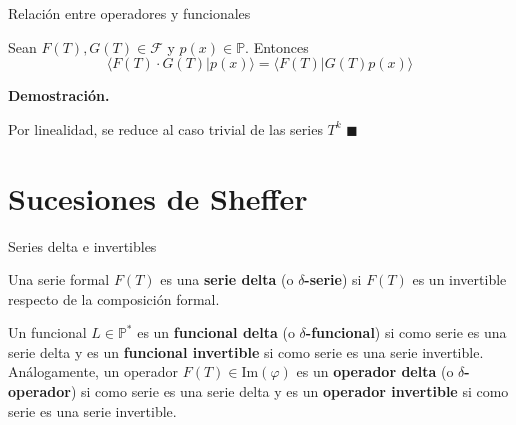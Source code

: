\documentclass{beamer}
\newenvironment{teorema}[1][]{
  \begin{tcolorbox}[colback=darkred!10, colframe=darkred!90, title=Teorema\ #1, fonttitle=\bfseries]
}{
  \end{tcolorbox}
}
\newenvironment{definicion}[1][]{
  \begin{tcolorbox}[colback=red!10, colframe=red!80!black, title=Definición\ #1, fonttitle=\bfseries]
}{
  \end{tcolorbox}
}
\newenvironment{demo}{%
  \par\medskip\noindent\textbf{Demostración.}\hspace{0.5em}%
}{%
  \hfill$\blacksquare$\par\medskip%
}
\newcommand{\F}{\mathscr{F}} %
\newcommand{\poly}{\mathbb{P}} %
\begin{document}
\begin{frame}[fragile]{Relación entre operadores y funcionales}
  \begin{teorema}[(adjunción operadores y funcionales)]
    Sean $F(T), G(T) \in \F$ y $p(x) \in \poly$. Entonces
    \begin{equation*}
        \langle F(T) \cdot G(T) | p(x) \rangle = \langle F(T) | G(T)p(x) \rangle 
    \end{equation*}
  \end{teorema}

  \begin{demo}
    Por linealidad, se reduce al caso trivial de las series $T^k$
  \end{demo}
\end{frame}

\section{Sucesiones de Sheffer}

  \begin{frame}{Series delta e invertibles}
    \begin{definicion}
      Una serie formal $F(T)$ es una \textbf{serie delta} (o \textbf{$\delta$-serie}) si $F(T)$ es un invertible respecto de la composición formal. 
      
      \centering{}
    \end{definicion}

    \vspace{0.5cm}

    \begin{definicion}
      \centering{}\flushleft
      Un funcional $L \in \poly^*$ es un \textbf{funcional delta} (o \textbf{$\delta$-funcional}) si como serie es una serie delta y es un \textbf{funcional invertible} si como serie es una serie invertible. Análogamente, un operador $F(T) \in \text{Im}(\varphi)$ es un \textbf{operador delta} (o \textbf{$\delta$-operador}) si como serie es una serie delta y es un \textbf{operador invertible} si como serie es una serie invertible. 
    \end{definicion}
    
  \end{frame}
\end{document}
